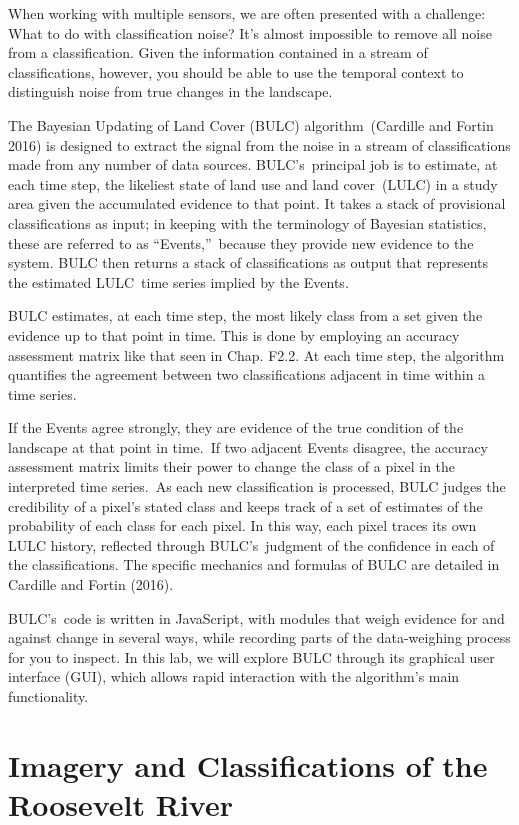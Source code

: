 \documentclass[
  letterpaper,
  DIV=11,
  numbers=noendperiod]{scrreprt}
\begin{document}
When working with multiple sensors, we are often presented with a
challenge: What to do with classification noise? It's almost impossible
to remove all noise from a classification. Given the information
contained in a stream of classifications, however, you should be able to
use the temporal context to distinguish noise from true changes in the
landscape.

The Bayesian Updating of Land Cover (BULC) algorithm~(Cardille and
Fortin 2016) is designed to extract the signal from the noise in a
stream of classifications made from any number of data sources.
BULC's~principal job is to estimate, at each time step, the likeliest
state of land use and land cover~(LULC) in a study area given the
accumulated evidence to that point. It takes a stack of provisional
classifications as input; in keeping with the terminology of Bayesian
statistics, these are referred to as ``Events,''~because they provide
new evidence to the system. BULC then returns a stack of classifications
as output that represents the estimated LULC~time series implied by the
Events.~

BULC estimates, at each time step, the most likely class from a set
given the evidence up to that point in time. This is done by employing
an accuracy assessment matrix like that seen in Chap. F2.2. At each time
step, the algorithm quantifies the agreement between two classifications
adjacent in time within a time series.

If the Events agree strongly, they are evidence of the true condition of
the landscape at that point in time.~If two adjacent Events disagree,
the accuracy assessment matrix limits their power to change the class of
a pixel in the interpreted time series.~As each new classification is
processed, BULC judges the credibility of a pixel's stated class and
keeps track of a set of estimates of the probability of each class for
each pixel. In this way, each pixel traces its own LULC history,
reflected through BULC's~judgment of the confidence in each of the
classifications. The specific mechanics and formulas of BULC are
detailed in Cardille and Fortin (2016).

BULC's~code is written in JavaScript, with modules that weigh evidence
for and against change in several ways, while recording parts of the
data-weighing process for you to inspect. In this lab, we will explore
BULC through its graphical user interface (GUI), which allows rapid
interaction with the algorithm's main functionality.

\hypertarget{imagery-and-classifications-of-the-roosevelt-river}{%
\section{Imagery and Classifications of the Roosevelt
River}\label{imagery-and-classifications-of-the-roosevelt-river}}
\end{document}
